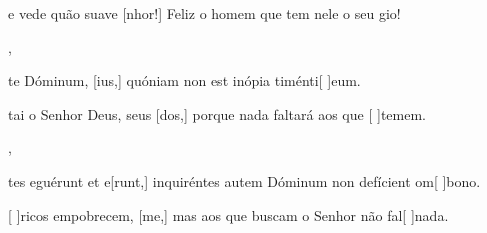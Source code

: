 {    {\item {} e vede quão suave [nhor!] Feliz o homem que tem nele o seu gio!~\Antiphona},
  {\item {}te Dóminum, [ius,] quóniam non est inópia timénti[ ]{e}um.~\Antiphona}%
    {\item {}tai o Senhor Deus, seus [dos,] porque nada faltará aos que [ ]{te}mem.~\Antiphona},
  {\item {}tes eguérunt et e[runt,] inquiréntes autem Dóminum non defícient om[ ]{bo}no.~\Antiphona}%
    {\item {}[ ]{ri}cos empobrecem, [me,] mas aos que buscam o Senhor não fal[ ]{na}da.~\Antiphona}
}